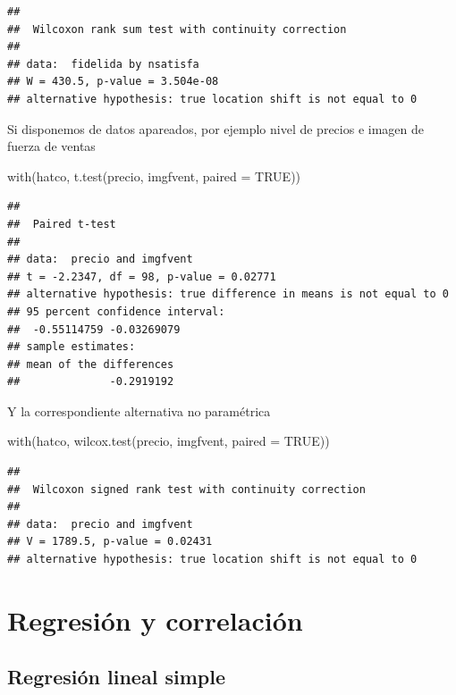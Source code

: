\documentclass[
]{book}
\newenvironment{Shaded}{\begin{snugshade}}{\end{snugshade}}
\newcommand{\AttributeTok}[1]{\textcolor[rgb]{0.77,0.63,0.00}{#1}}
\newcommand{\ConstantTok}[1]{\textcolor[rgb]{0.00,0.00,0.00}{#1}}
\newcommand{\FunctionTok}[1]{\textcolor[rgb]{0.00,0.00,0.00}{#1}}
\newcommand{\NormalTok}[1]{#1}
\theoremstyle{break}
\theoremstyle{nonumberplain}
\begin{document}
\begin{verbatim}
## 
##  Wilcoxon rank sum test with continuity correction
## 
## data:  fidelida by nsatisfa
## W = 430.5, p-value = 3.504e-08
## alternative hypothesis: true location shift is not equal to 0
\end{verbatim}

Si disponemos de datos apareados, por ejemplo nivel de precios e imagen
de fuerza de ventas

\begin{Shaded}
\begin{Highlighting}[]
\FunctionTok{with}\NormalTok{(hatco, }\FunctionTok{t.test}\NormalTok{(precio, imgfvent, }\AttributeTok{paired =} \ConstantTok{TRUE}\NormalTok{))}
\end{Highlighting}
\end{Shaded}

\begin{verbatim}
## 
##  Paired t-test
## 
## data:  precio and imgfvent
## t = -2.2347, df = 98, p-value = 0.02771
## alternative hypothesis: true difference in means is not equal to 0
## 95 percent confidence interval:
##  -0.55114759 -0.03269079
## sample estimates:
## mean of the differences 
##              -0.2919192
\end{verbatim}

Y la correspondiente alternativa no paramétrica

\begin{Shaded}
\begin{Highlighting}[]
\FunctionTok{with}\NormalTok{(hatco, }\FunctionTok{wilcox.test}\NormalTok{(precio, imgfvent, }\AttributeTok{paired =} \ConstantTok{TRUE}\NormalTok{))}
\end{Highlighting}
\end{Shaded}

\begin{verbatim}
## 
##  Wilcoxon signed rank test with continuity correction
## 
## data:  precio and imgfvent
## V = 1789.5, p-value = 0.02431
## alternative hypothesis: true location shift is not equal to 0
\end{verbatim}

\hypertarget{regresiuxf3n-y-correlaciuxf3n}{%
\section{Regresión y correlación}\label{regresiuxf3n-y-correlaciuxf3n}}

\hypertarget{regresiuxf3n-lineal-simple}{%
\subsection{Regresión lineal simple}\label{regresiuxf3n-lineal-simple}}
\end{document}
